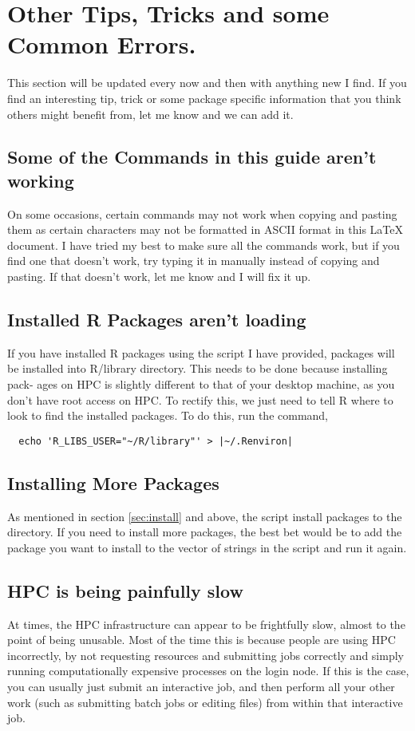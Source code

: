\section{Other Tips, Tricks and some Common Errors.}
This section will be updated every now and then with anything new I find. If you find an interesting tip, trick or some package specific information that you think others might benefit from, let me know and we can add it.
%
%
\subsection{ Some of the Commands in this guide aren't working \frownie}
On some occasions, certain commands may not work when copying and pasting them as certain characters may not be formatted in ASCII format in this LaTeX document. I have tried my best to make sure all the commands work, but if you find one that doesn’t work, try typing it in manually instead of copying and pasting. If that doesn’t work, let me know and I will fix it up.
%
%
\subsection{Installed R Packages aren't loading}
%
%
If you have installed R packages using the script I have provided, packages will be installed into R/library directory. This needs to be done because installing pack- ages on HPC is slightly different to that of your desktop machine, as you don’t have root access on HPC. To rectify this, we just need to tell R where to look to find the installed packages. To do this, run the command,
%
\begin{verbatim}
  echo 'R_LIBS_USER="~/R/library"' > |~/.Renviron|
\end{verbatim}
%
%
%
\subsection{Installing More Packages}
%
%
As mentioned in section \ref{sec:install} and above, the  script install packages to the  directory. If you need to install more packages, the best bet would be to add the package you want to install to the vector of strings in the  script and run it again.
%
%
%
%
\subsection{HPC is being painfully slow \frownie}
%
%
At times, the HPC infrastructure can appear to be frightfully slow, almost to the point of being unusable. Most of the time this is because people are using HPC incorrectly, by not requesting resources and submitting jobs correctly and simply running computationally expensive processes on the login node. If this is the case, you can usually just submit an interactive job, and then perform all your other work (such as submitting batch jobs or editing files) from within that interactive job.
%
%
%
%
